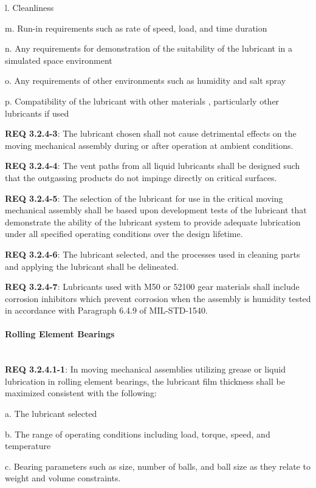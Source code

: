 \documentclass[12pt]{article}
\begin{document}
l. Cleanliness

m. Run-in requirements such as rate of speed, load, and time duration

n. Any requirements for demonstration of the suitability of the lubricant in a simulated space environment

o. Any requirements of other environments such as humidity and salt spray

p. Compatibility of the lubricant with other materials , particularly other lubricants if used

\noindent \textbf{REQ 3.2.4-3}: The lubricant chosen shall not cause detrimental effects on the moving mechanical assembly during or after operation at ambient conditions. 

\noindent \textbf{REQ 3.2.4-4}: The vent paths from all liquid lubricants shall be designed such that the outgassing products do not impinge directly on critical surfaces. 

\noindent \textbf{REQ 3.2.4-5}: The selection of the lubricant for use in the critical moving mechanical assembly shall be based upon development tests of the lubricant that demonstrate the ability of the lubricant system to provide adequate lubrication under all specified operating conditions over the design lifetime. 

\noindent \textbf{REQ 3.2.4-6}: The lubricant selected, and the processes used in cleaning parts and applying the lubricant shall be delineated. 

\noindent \textbf{REQ 3.2.4-7}: Lubricants used with M50 or 52100 gear materials shall include corrosion inhibitors which prevent corrosion when the assembly is humidity tested in accordance with Paragraph 6.4.9 of MIL-STD-1540.


\paragraph{Rolling Element Bearings} \mbox{} \\ %
\noindent \textbf{REQ 3.2.4.1-1}: In moving mechanical assemblies utilizing grease or liquid lubrication in rolling element bearings, the lubricant film thickness shall be maximized consistent with the following:

a. The lubricant selected

b. The range of operating conditions including load, torque, speed, and temperature

c. Bearing parameters such as size, number of balls, and ball size as they relate to weight and volume constraints.
\end{document}
